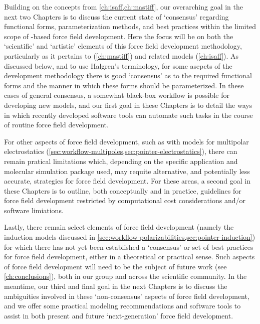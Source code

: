 Building on the concepts from \cref{ch:isaff,ch:mastiff}, our overarching goal in 
the next two Chapters is to discuss the current state of `consensus'
regarding functional forms, parameterization methods, and best practices
within
the limited scope of \sapt-based force field development.
Here the focus will be on both the `scientific' and `artistic' elements
of this force field development methodology, particularly as it pertains to 
\mastiff (\cref{ch:mastiff}) and related models (\cref{ch:isaff}). As discussed below, 
and to use Halgren's terminology, for some asepcts of the \mastiff
development methodology there is good `consensus' as to the required
functional forms and the manner in which these forms should be parameterized.
In these cases of general consensus, a somewhat black-box
workflow is possible for developing new \mastiff models, and our first goal in
these Chapters is to detail 
the ways in which
recently
developed software tools can automate such tasks in the
course of
routine force field development.

For other aspects of force field development, such as with models for
multipolar electrostatics
(\cref{sec:workflow-multipoles,sec:pointer-electrostatics}), 
there can remain pratical limitations 
which,
depending on the specific application and molecular simulation package used,
may requite alternative, and potentially less accurate, strategies
for force field development. For these areas, a second
goal in these Chapters is to outline, both conceptually and in practice,
guidelines for force field development 
restricted by computational cost considerations and/or software limiations.

Lastly, there remain select elements of force field development (namely the induction
models discussed in \cref{sec:workflow-polarizabilities,sec:pointer-induction}) for which there has not yet
been established a `consensus' or set of best practices for force field
development, either in a theoretical or practical sense. Such
aspects of force field development will need to be the subject of future work (see
\cref{ch:conclusions}), both in our group and across the scientific community.
In the meantime, our third and
final goal in the next Chapters is to discuss the ambiguities involved in these
`non-consensus' aspects of force field development, and we offer some
practical modeling recommendations and software tools to assist in both
present and future `next-generation' force field development.

